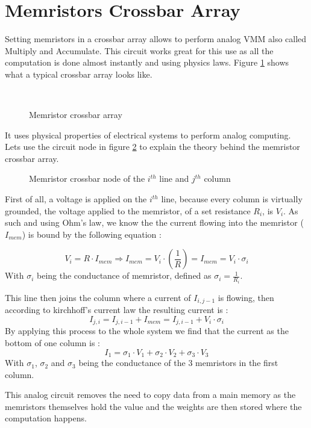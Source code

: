 \section{Memristors Crossbar Array}\label{sec:crossbar}

Setting memristors in a crossbar array allows to perform analog \ac{VMM} also called Multiply and Accumulate. This circuit works great for this use as all the computation is done almost instantly and using physics laws. Figure \ref{fig:crossbar} shows what a typical crossbar array looks like.

\begin{figure}[H]
  \centering
  \subfloat[Schematics]{}%
  \hfill
  \\
  \caption{Memristor crossbar array}
  \label{fig:crossbar}
\end{figure}

It uses physical properties of electrical systems to perform analog computing. Lets use the circuit node in figure \ref{fig:crossNode} to explain the theory behind the memristor crossbar array.
\begin{figure}[H]
  \centering
  
  \caption{Memristor crossbar node of the $i^{th}$ line and $j^{th}$ column}
  \label{fig:crossNode}
\end{figure}

First of all, a voltage is applied on the $i^{th}$ line, because every column is virtually grounded, the voltage applied to the memristor, of a set resistance $R_i$, is $V_i$. As such and using Ohm's law, we know the the current flowing into the memristor ($I_{mem}$) is bound by the following equation :

\begin{equation}
  V_i = R\cdot I_{mem} \Rightarrow I_{mem} = V_i\cdot (\frac{1}{R})=I_{mem} = V_i\cdot\sigma_i
\end{equation}
With $\sigma_i$ being the conductance of memristor, defined as $\sigma_i=\frac{1}{R_i}$.

This line then joins the column where a current of $I_{i,j-1}$ is flowing, then according to kirchhoff's current law the resulting current is :
\begin{equation}
  I_{j,i} = I_{j,i-1}+I_{mem} = I_{j,i-1} + V_i\cdot\sigma_i
\end{equation}
By applying this process to the whole system we find that the current as the bottom of one column is :
\begin{equation}
  I_1=\sigma_1\cdot V_1 + \sigma_2\cdot V_2 + \sigma_3\cdot V_3
\end{equation}
With $\sigma_1$, $\sigma_2$ and $\sigma_3$ being the conductance of the 3 memristors in the first column.

This analog circuit removes the need to copy data from a main memory as the memristors themselves hold the value and the weights are then stored where the computation happens.%
